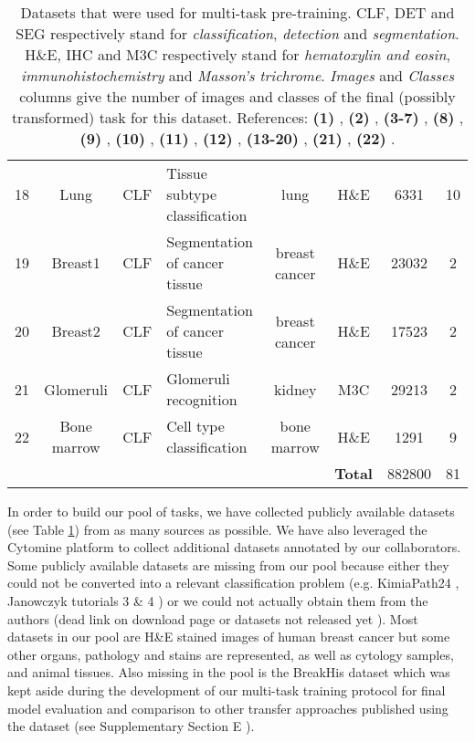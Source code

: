 \begin{table}[t]
\begin{tabular}{|r|c|c|l|c|c|c|c|}
18 & Lung & CLF & Tissue subtype classification & lung & H\&E & 6331 & 10 \\
19 & Breast1 & CLF & Segmentation of cancer tissue & breast cancer & H\&E & 23032 & 2 \\
20 & Breast2 & CLF & Segmentation of cancer tissue & breast cancer & H\&E & 17523 & 2 \\
21 & Glomeruli & CLF & Glomeruli recognition & kidney & M3C & 29213 & 2 \\
22 & Bone marrow & CLF & Cell type classification & bone marrow & H\&E & 1291 & 9 \\
        \hline 
\multicolumn{5}{|c|}{} & \textbf{Total} & 882800 & 81 \\
\hline
    \end{tabular}
    \caption{Datasets that were used for multi-task pre-training. CLF, DET and SEG respectively stand for \textit{classification}, \textit{detection} and \textit{segmentation}. H\&E, IHC and M3C respectively stand for \textit{hematoxylin and eosin}, \textit{immunohistochemistry} and \textit{Masson's trichrome}. \textit{Images} and \textit{Classes} columns give the number of images and classes of the final (possibly transformed) task for this dataset. References: \textbf{(1)} \parencite{roux2014mitos}, \textbf{(2)} \parencite{sirinukunwattana2016locality}, \textbf{(3-7)} \parencite{janowczyk2016deep}, \textbf{(8)} \parencite{linder2012identification}, \textbf{(9)} \parencite{veta2019predicting}, \textbf{(10)} \parencite{aresta2019bach}, \textbf{(11)} \parencite{bejnordi2017diagnostic}, \textbf{(12)} \parencite{kather2016multi}, \textbf{(13-20)} \parencite{mormont2018comparison}, \textbf{(21)} \parencite{maree2016approach} , \textbf{(22)} \parencite{kainz2017training}.} 
    \label{tab:mtask:datasets}
\end{table}

In order to build our pool of tasks, we have collected publicly available datasets (see Table \ref{tab:mtask:datasets}) from as many sources as possible. We have also leveraged the Cytomine \parencite{maree2016collaborative} platform to collect additional datasets annotated by our collaborators. Some publicly available datasets are missing from our pool because either they could not be converted into a relevant classification problem (e.g. KimiaPath24  \parencite{babaie2017classification}, Janowczyk tutorials 3 \& 4 \parencite{janowczyk2016deep}) or we could not actually obtain them from the authors (\eg dead link on download page or datasets not released yet \parencite{gamper2019pannuke}). Most datasets in our pool are H\&E stained images of human breast cancer but some other organs, pathology and stains are represented, as well as cytology samples, and animal tissues. Also missing in the pool is the BreakHis \parencite{spanhol2015dataset} dataset which was kept aside during the development of our multi-task training protocol for final model evaluation and comparison to other transfer approaches published using the dataset (see Supplementary Section E ). 

